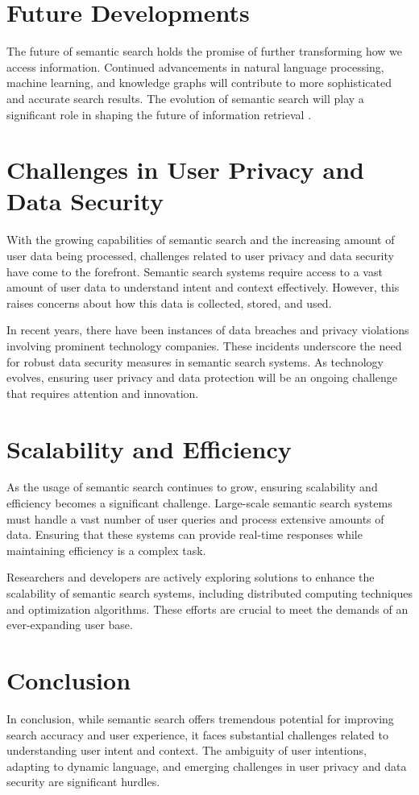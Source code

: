 \documentclass[10pt,oneside,a4paper]{article}
\begin{document}
\section{Future Developments}
The future of semantic search holds the promise of further transforming how we access information. Continued advancements in natural language processing, machine learning, and knowledge graphs will contribute to more sophisticated and accurate search results. The evolution of semantic search will play a significant role in shaping the future of information retrieval \cite{Jurafsky2020}.

\section{Challenges in User Privacy and Data Security}
With the growing capabilities of semantic search and the increasing amount of user data being processed, challenges related to user privacy and data security have come to the forefront. Semantic search systems require access to a vast amount of user data to understand intent and context effectively. However, this raises concerns about how this data is collected, stored, and used.

In recent years, there have been instances of data breaches and privacy violations involving prominent technology companies. These incidents underscore the need for robust data security measures in semantic search systems. As technology evolves, ensuring user privacy and data protection will be an ongoing challenge that requires attention and innovation.

\section{Scalability and Efficiency}
As the usage of semantic search continues to grow, ensuring scalability and efficiency becomes a significant challenge. Large-scale semantic search systems must handle a vast number of user queries and process extensive amounts of data. Ensuring that these systems can provide real-time responses while maintaining efficiency is a complex task.

Researchers and developers are actively exploring solutions to enhance the scalability of semantic search systems, including distributed computing techniques and optimization algorithms. These efforts are crucial to meet the demands of an ever-expanding user base.

\section{Conclusion}
In conclusion, while semantic search offers tremendous potential for improving search accuracy and user experience, it faces substantial challenges related to understanding user intent and context. The ambiguity of user intentions, adapting to dynamic language, and emerging challenges in user privacy and data security are significant hurdles.
\end{document}
